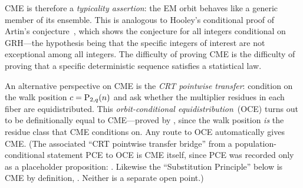 \begin{remark}
\smallskip
CME is therefore a \emph{typicality assertion}: the EM orbit behaves
like a generic member of its ensemble.  This is analogous to
Hooley's conditional proof of Artin's conjecture~\cite{Hooley1967},
which shows the conjecture for all integers conditional on GRH---the
hypothesis being that the specific integers of interest are not
exceptional among all integers.  The difficulty of proving CME is
the difficulty of proving that a specific deterministic sequence
satisfies a statistical law.
\end{remark}

\begin{remark}
An alternative perspective on CME is the \emph{CRT pointwise transfer}:
condition on the walk position $c = \mathrm{P}_{2,q}(n)$ and ask whether
the multiplier residues in each fiber are equidistributed.
This \emph{orbit-conditional equidistribution}~(OCE) turns out to be
definitionally equal to CME---proved by , since the walk
position \emph{is} the residue class that CME conditions on.
Any route to OCE automatically gives CME\@.  (The associated
``CRT pointwise transfer bridge'' from a population-conditional
statement PCE to OCE is CME itself, since PCE was recorded only as a
placeholder proposition:
.
Likewise the ``Substitution Principle'' below is CME by definition,
.  Neither is a separate open point.)
\end{remark}

